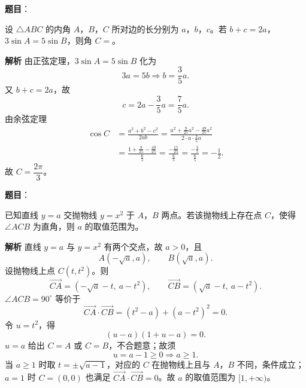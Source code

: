 \begin{answer}

\textbf{题目}：

设 $\triangle ABC$ 的内角 $A$，$B$，$C$ 所对边的长分别为 $a$，$b$，$c$。若 $b+c=2a$，$3\sin A=5\sin B$，则角 $C=$\gkblank{}。

\textbf{解析}
由正弦定理，$3\sin A=5\sin B$ 化为
\nopagebreak[4]
\[3a=5b\Longrightarrow b=\frac35a.\]
又 $b+c=2a$，故
\nopagebreak[4]
\[c=2a-\frac35a=\frac75a.\]
由余弦定理
\nopagebreak[4]
\[\begin{aligned}
\cos C&=\frac{a^2+b^2-c^2}{2ab}
=\frac{a^2+\frac9{25}a^2-\frac{49}{25}a^2}{2\cdot a\cdot\frac35a}\\
&=\frac{1+\frac9{25}-\frac{49}{25}}{\frac65}
=\frac{-\frac{15}{25}}{\frac65}
=\frac{-\frac35}{\frac65}=-\frac12.
\end{aligned}\]
故 $C=\dfrac{2\pi}{3}$。


\end{answer}
\begin{answer}

\textbf{题目}：

已知直线 $y=a$ 交抛物线 $y=x^2$ 于 $A$，$B$ 两点。若该抛物线上存在点 $C$，使得 $\angle ACB$ 为直角，则 $a$ 的取值范围为\gkblank{}。

\textbf{解析}
直线 $y=a$ 与 $y=x^2$ 有两个交点，故 $a>0$，且
\nopagebreak[4]
\[A(-\sqrt a,a),\qquad B(\sqrt a,a).\]
设抛物线上点 $C(t,t^2)$。则
\nopagebreak[4]
\[\overrightarrow{CA}=(-\sqrt a-t,\ a-t^2),\qquad \overrightarrow{CB}=(\sqrt a-t,\ a-t^2).\]
$\angle ACB=90^\circ$ 等价于
\nopagebreak[4]
\[\overrightarrow{CA}\cdot\overrightarrow{CB}=(t^2-a)+(a-t^2)^2=0.\]
令 $u=t^2$，得
\nopagebreak[4]
\[(u-a)(1+u-a)=0.\]
$u=a$ 给出 $C=A$ 或 $C=B$，不合题意；故须
\nopagebreak[4]
\[u=a-1\geqslant0\Longrightarrow a\geqslant1.\]
当 $a\geqslant1$ 时取 $t=\pm\sqrt{a-1}$，对应的 $C$ 在抛物线上且与 $A$，$B$ 不同，条件成立；$a=1$ 时 $C=(0,0)$ 也满足 $\overrightarrow{CA}\cdot\overrightarrow{CB}=0$。故 $a$ 的取值范围为 $[1,+\infty)$。

\gkanswer{答案：$[1,+\infty)$。设 $C(t,t^2)$，由 $\overrightarrow{CA}\cdot\overrightarrow{CB}=0$ 得 $(t^2-a)(t^2-a+1)=0$，非退化情形须 $a-1\geqslant0$。}

\end{answer}
